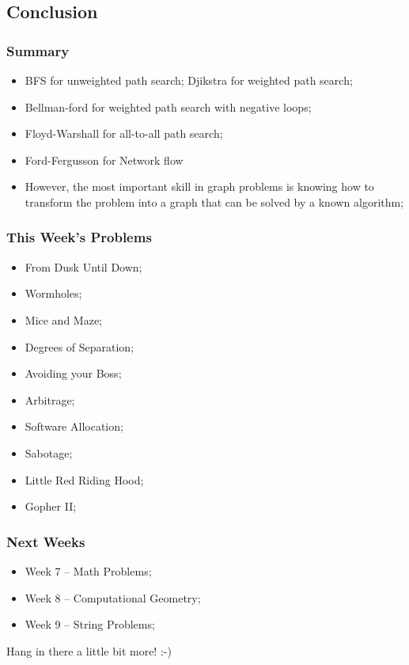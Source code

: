 \documentclass{beamer}
\begin{document}
\subsection{Conclusion}
\begin{frame}
  \frametitle{Summary}
  \begin{itemize}
  \item BFS for unweighted path search; Djikstra for weighted path search;
  \item Bellman-ford for weighted path search with negative loops;
  \item Floyd-Warshall for all-to-all path search;
  \item Ford-Fergusson for Network flow

    \bigskip

  \item However, the most important skill in graph problems is knowing
    how to transform the problem into a graph that can be solved by a
    known algorithm;
  \end{itemize}
\end{frame}

\begin{frame}
  \frametitle{This Week's Problems}
  {\smaller
  \begin{itemize}
    \item From Dusk Until Down;
    \item Wormholes; 
    \item Mice and Maze; 
    \item Degrees of Separation;
    \item Avoiding your Boss;
    \item Arbitrage;
    \item \alert{Software Allocation};
    \item \alert{Sabotage};
    \item \alert{Little Red Riding Hood};
    \item \alert{Gopher II};
  \end{itemize}}
\end{frame}

\begin{frame}
  \frametitle{Next Weeks}
  \begin{itemize}
  \item Week 7 -- Math Problems;
  \item Week 8 -- Computational Geometry;
  \item Week 9 -- String Problems;
  \end{itemize}

  \vfill
  
  Hang in there a little bit more! :-)
  
\end{frame}
\end{document}
